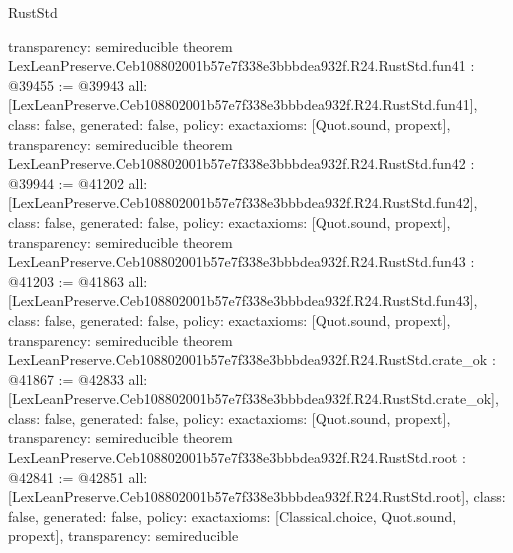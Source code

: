 \begin{lexlean}{RustStd}
\begin{coremodule}
{  transparency: semireducible
}
theorem LexLeanPreserve.Ceb108802001b57e7f338e3bbbdea932f.R24.RustStd.fun41 : @39455 := @39943 {
  all: [LexLeanPreserve.Ceb108802001b57e7f338e3bbbdea932f.R24.RustStd.fun41],
  class: false,
  generated: false,
  policy: exact{axioms: [Quot.sound, propext]},
  transparency: semireducible
}
theorem LexLeanPreserve.Ceb108802001b57e7f338e3bbbdea932f.R24.RustStd.fun42 : @39944 := @41202 {
  all: [LexLeanPreserve.Ceb108802001b57e7f338e3bbbdea932f.R24.RustStd.fun42],
  class: false,
  generated: false,
  policy: exact{axioms: [Quot.sound, propext]},
  transparency: semireducible
}
theorem LexLeanPreserve.Ceb108802001b57e7f338e3bbbdea932f.R24.RustStd.fun43 : @41203 := @41863 {
  all: [LexLeanPreserve.Ceb108802001b57e7f338e3bbbdea932f.R24.RustStd.fun43],
  class: false,
  generated: false,
  policy: exact{axioms: [Quot.sound, propext]},
  transparency: semireducible
}
theorem LexLeanPreserve.Ceb108802001b57e7f338e3bbbdea932f.R24.RustStd.crate_ok : @41867 := @42833 {
  all: [LexLeanPreserve.Ceb108802001b57e7f338e3bbbdea932f.R24.RustStd.crate_ok],
  class: false,
  generated: false,
  policy: exact{axioms: [Quot.sound, propext]},
  transparency: semireducible
}
theorem LexLeanPreserve.Ceb108802001b57e7f338e3bbbdea932f.R24.RustStd.root : @42841 := @42851 {
  all: [LexLeanPreserve.Ceb108802001b57e7f338e3bbbdea932f.R24.RustStd.root],
  class: false,
  generated: false,
  policy: exact{axioms: [Classical.choice, Quot.sound, propext]},
  transparency: semireducible
}


\end{coremodule}
\end{lexlean}
